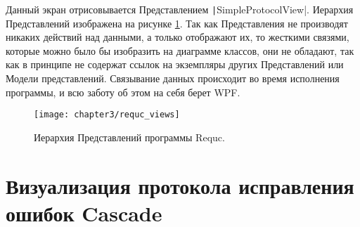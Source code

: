 Данный экран отрисовывается Представлением \texttt|SimpleProtocolView|. Иерархия Представлений изображена на рисунке \ref{fig:requc_views}. Так как Представления не производят никаких действий над данными, а только отображают их, то жесткими связями, которые можно было бы изобразить на диаграмме классов, они не обладают, так как в принципе не содержат ссылок на экземпляры других Представлений или Модели представлений. Связывание данных происходит во время исполнения программы, и всю заботу об этом на себя берет WPF.
\begin{figure}[h]
  \texttt{[image: chapter3/requc\_views]}
  \caption{Иерархия Представлений программы Requc.}
  \label{fig:requc_views}
\end{figure}




\section{Визуализация протокола исправления ошибок Cascade}
